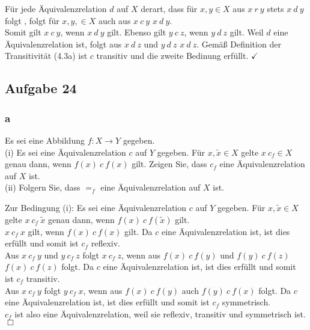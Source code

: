 \documentclass[a4paper,graphics,11pt]{article}
\newcommand\aufgabe[1]{\subsection*{Aufgabe #1}}
\newcommand\aufgabenteil[1]{\subsubsection*{#1}}
\begin{document}
F{\"u}r jede {\"A}quivalenzrelation $d$ auf $X$ derart, dass f{\"u}r $x,y \in X$ aus $x~r~y$ stets $x~d~y$ folgt , folgt f{\"u}r $x,y, \in X$ auch aus $x~c~y$ $x~d~y$.\\
Somit gilt $x~c~y$, wenn $x~d~y$ gilt. Ebenso gilt $y~c~z$, wenn $y~d~z$ gilt. Weil $d$ eine {\"A}quivalenzrelation ist, folgt aus $x~d~z$ und $y~d~z$ $x~d~z$. Gem{\"a}{\ss} Definition der Transitivit{\"a}t (4.3a) ist $c$ transitiv und die zweite Bedinung erf{\"u}llt. $\checkmark$ 
\aufgabe{24}
\aufgabenteil{a}
Es sei eine Abbildung $f:X \to Y$ gegeben.\\
(i)  Es sei eine {\"A}quivalenzrelation $c$ auf $Y$ gegeben. F{\"u}r $x,\tilde{x} \in X$ gelte $x~c_{f} \in X$ genau dann, wenn $f(x)~c~f(x)$ gilt. Zeigen Sie, dass $c_{f}$ eine {\"A}quivalenzrelation auf $X$ ist.\\
(ii)  Folgern Sie, dass $=_{f}$ eine {\"A}quivalenzrelation auf $X$ ist.

Zur Bedingung (i): Es sei eine {\"A}quivalenzrelation $c$ auf $Y$ gegeben. F{\"u}r $x,\tilde{x} \in X$ gelte $x~c_{f}~\tilde{x}$ genau dann, wenn $f(x)~c~f(\tilde{x})$ gilt.\\
$x~c_{f}~x$ gilt, wenn $f(x)~c~f(x)$ gilt. Da $c$ eine {\"A}quivalenzrelation ist, ist dies erf{\"u}llt und somit ist $c_{f}$ reflexiv. \checkmark \\
Aus $x~c_{f}~y$ und $y~c_{f}~z$ folgt $x~c_{f}~z$, wenn aus $f(x)~c~f(y)$ und $f(y)~c~f(z)$ $f(x)~c~f(z)$ folgt. Da $c$ eine {\"A}quivalenzrelation ist, ist dies erf{\"u}llt und somit ist $c_{f}$ transitiv. \checkmark \\
Aus $x~c_{f}~y$ folgt $y~c_{f}~x$, wenn aus $f(x)~c~f(y)$ auch $f(y)~c~f(x)$ folgt. Da $c$ eine {\"A}quivalenzrelation ist, ist dies erf{\"u}llt und somit ist $c_{f}$ symmetrisch. \checkmark \\
$c_{f}$ ist also eine {\"A}quivalenzrelation, weil sie reflexiv, transitiv und symmetrisch ist. $\Box$ \\
\end{document}
